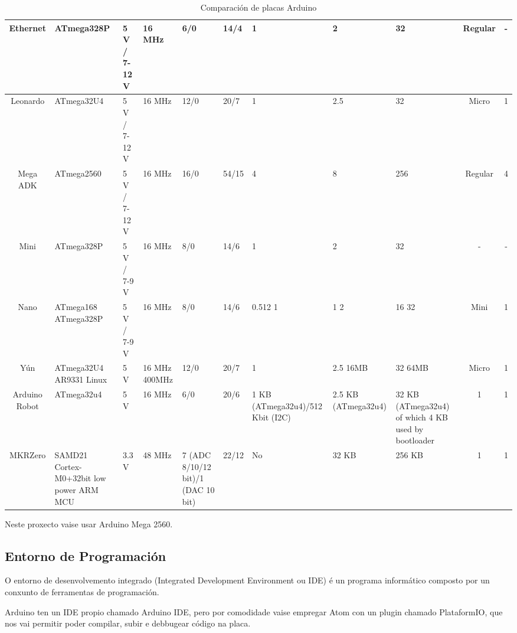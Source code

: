 \documentclass[11pt,twoside]{book}
\begin{document}
\begin{table}[htb]
\begin{center}
{\begin{tabular}{|c|m{3cm}|m{3.5cm}|m{2cm}|m{2cm}|m{2cm}|m{2cm}|m{2cm}|m{2cm}|c|c|}
\hline
Ethernet & ATmega328P & 5 V / 7-12 V & 16 MHz & 6/0 & 14/4 & 1 & 2 & 32 & Regular & - \\
\hline
Leonardo & ATmega32U4 & 5 V / 7-12 V & 16 MHz & 12/0 & 20/7 & 1 & 2.5 & 32 & Micro & 1 \\
\hline
Mega ADK & ATmega2560 & 5 V / 7-12 V & 16 MHz & 16/0 & 54/15 & 4 & 8 & 256 & Regular & 4 \\
\hline
Mini & ATmega328P & 5 V / 7-9 V & 16 MHz & 8/0 & 14/6 & 1 & 2 & 32 & - & - \\
\hline
Nano & ATmega168 \newline ATmega328P & 5 V / 7-9 V & 16 MHz & 8/0 & 14/6 & 0.512  1 & 1  2 & 16 32 & Mini & 1 \\
\hline
Yún & ATmega32U4 \newline AR9331 Linux & 5 V & 16 MHz \newline 400MHz & 12/0 & 20/7 & 1 & 2.5 \newline  16MB & 32 \newline   64MB & Micro & 1 \\
\hline
Arduino Robot & ATmega32u4 & 5 V & 16 MHz & 6/0 & 20/6 & 1 KB (ATmega32u4)/512 Kbit (I2C) & 2.5 KB (ATmega32u4) & 32 KB (ATmega32u4) of which 4 KB used by bootloader & 1 & 1 \\
\hline
MKRZero & SAMD21 \newline  Cortex-M0+32bit low power \newline ARM MCU & 3.3 V & 48 MHz & 7 (ADC 8/10/12 bit)/1 (DAC 10 bit) & 22/12 & No & 32 KB & 256 KB & 1 & 1 \\
\hline
\end{tabular}
}
\caption{Comparación de placas Arduino}
\label{taboa:comparacionPlacasArduino}
\end{center}
\end{table}

Neste proxecto vaise usar Arduino Mega 2560.

\subsection{Entorno de Programación}

O entorno de desenvolvemento integrado (Integrated Development Environment ou IDE) é un programa informático composto por un conxunto de ferramentas de programación. 

Arduino ten un IDE propio chamado Arduino IDE, pero por comodidade vaise empregar Atom con un plugin chamado PlataformIO, que nos vai permitir poder compilar, subir e debbugear código na placa.
\end{document}
